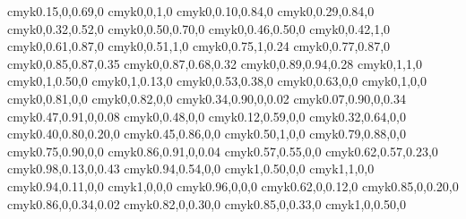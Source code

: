 \definecolor{GreenYellow}   {cmyk}{0.15,0,0.69,0}
\definecolor{Yellow}        {cmyk}{0,0,1,0}
\definecolor{Goldenrod}     {cmyk}{0,0.10,0.84,0}
\definecolor{Dandelion}     {cmyk}{0,0.29,0.84,0}
\definecolor{Apricot}       {cmyk}{0,0.32,0.52,0}
\definecolor{Peach}         {cmyk}{0,0.50,0.70,0}
\definecolor{Melon}         {cmyk}{0,0.46,0.50,0}
\definecolor{YellowOrange}  {cmyk}{0,0.42,1,0}
\definecolor{Orange}        {cmyk}{0,0.61,0.87,0}
\definecolor{BurntOrange}   {cmyk}{0,0.51,1,0}
\definecolor{Bittersweet}   {cmyk}{0,0.75,1,0.24}
\definecolor{RedOrange}     {cmyk}{0,0.77,0.87,0}
\definecolor{Mahogany}      {cmyk}{0,0.85,0.87,0.35}
\definecolor{Maroon}        {cmyk}{0,0.87,0.68,0.32}
\definecolor{BrickRed}      {cmyk}{0,0.89,0.94,0.28}
\definecolor{Red}           {cmyk}{0,1,1,0}
\definecolor{OrangeRed}     {cmyk}{0,1,0.50,0}
\definecolor{RubineRed}     {cmyk}{0,1,0.13,0}
\definecolor{Salmon}        {cmyk}{0,0.53,0.38,0}
\definecolor{CarnationPink} {cmyk}{0,0.63,0,0}
\definecolor{Magenta}       {cmyk}{0,1,0,0}
\definecolor{VioletRed}     {cmyk}{0,0.81,0,0}
\definecolor{Rhodamine}     {cmyk}{0,0.82,0,0}
\definecolor{Mulberry}      {cmyk}{0.34,0.90,0,0.02}
\definecolor{RedViolet}     {cmyk}{0.07,0.90,0,0.34}
\definecolor{Fuchsia}       {cmyk}{0.47,0.91,0,0.08}
\definecolor{Lavender}      {cmyk}{0,0.48,0,0}
\definecolor{Thistle}       {cmyk}{0.12,0.59,0,0}
\definecolor{Orchid}        {cmyk}{0.32,0.64,0,0}
\definecolor{DarkOrchid}    {cmyk}{0.40,0.80,0.20,0}
\definecolor{Purple}        {cmyk}{0.45,0.86,0,0}
\definecolor{Plum}          {cmyk}{0.50,1,0,0}
\definecolor{Violet}        {cmyk}{0.79,0.88,0,0}
\definecolor{RoyalPurple}   {cmyk}{0.75,0.90,0,0}
\definecolor{BlueViolet}    {cmyk}{0.86,0.91,0,0.04}
\definecolor{Periwinkle}    {cmyk}{0.57,0.55,0,0}
\definecolor{CadetBlue}     {cmyk}{0.62,0.57,0.23,0}
\definecolor{MidnightBlue}  {cmyk}{0.98,0.13,0,0.43}
\definecolor{NavyBlue}      {cmyk}{0.94,0.54,0,0}
\definecolor{RoyalBlue}     {cmyk}{1,0.50,0,0}
\definecolor{Blue}          {cmyk}{1,1,0,0}
\definecolor{Cerulean}      {cmyk}{0.94,0.11,0,0}
\definecolor{Cyan}          {cmyk}{1,0,0,0}
\definecolor{ProcessBlue}   {cmyk}{0.96,0,0,0}
\definecolor{SkyBlue}       {cmyk}{0.62,0,0.12,0}
\definecolor{Turquoise}     {cmyk}{0.85,0,0.20,0}
\definecolor{TealBlue}      {cmyk}{0.86,0,0.34,0.02}
\definecolor{Aquamarine}    {cmyk}{0.82,0,0.30,0}
\definecolor{BlueGreen}     {cmyk}{0.85,0,0.33,0}
\definecolor{Emerald}       {cmyk}{1,0,0.50,0}
